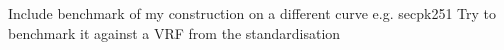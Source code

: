 Include benchmark of my construction on a different curve e.g. secpk251
Try to benchmark it against a VRF from the standardisation





